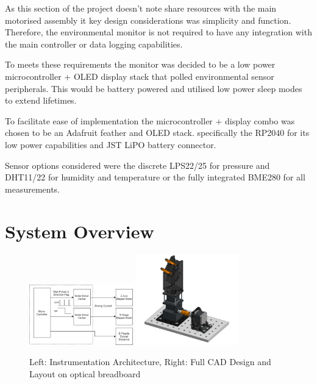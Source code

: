 As this section of the project doesn't note share resources with the main motorised assembly it key design considerations was simplicity and function.
Therefore, the environmental monitor is not required to have any integration with the main controller or data logging capabilities.

To meets these requirements the monitor was decided to be a low power microcontroller + OLED display stack that polled environmental sensor peripherals. This would be battery powered and utilised low power sleep modes to extend lifetimes.

To facilitate ease of implementation the microcontroller + display combo was chosen to be an Adafruit feather and OLED stack. specifically the RP2040 for its low power capabilities and JST LiPO battery connector.

Sensor options considered were the discrete LPS22/25 for pressure and DHT11/22 for humidity and temperature or the fully integrated BME280 for all measurements. 

\section{System Overview}

\begin{figure}[h]
    \centering
    \includegraphics[width=0.4\textwidth]{img/ED_block_diag.png}
    \includegraphics[width=0.4\textwidth]{img/full_mech.png}
    \caption{Left: Instrumentation Architecture, Right: Full CAD Design and Layout on optical breadboard}
    \label{fig:sys_des}
\end{figure}

